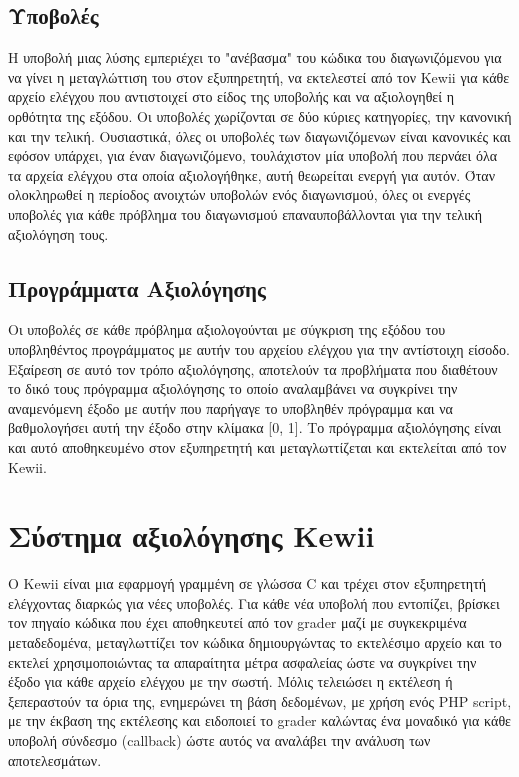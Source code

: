 \documentclass[diploma]{softlab-thesis}
\begin{document}
\subsection{Υποβολές}

Η υποβολή μιας λύσης εμπεριέχει το "ανέβασμα" του κώδικα του διαγωνιζόμενου για
να γίνει η μεταγλώττιση του στον εξυπηρετητή, να εκτελεστεί από τον Kewii για
κάθε αρχείο ελέγχου που αντιστοιχεί στο είδος της υποβολής και να αξιολογηθεί η
ορθότητα της εξόδου. Οι υποβολές χωρίζονται σε δύο κύριες κατηγορίες, την
κανονική και την τελική. Ουσιαστικά, όλες οι υποβολές των διαγωνιζόμενων είναι
κανονικές και εφόσον υπάρχει, για έναν διαγωνιζόμενο, τουλάχιστον μία υποβολή
που περνάει όλα τα αρχεία ελέγχου στα οποία αξιολογήθηκε, αυτή θεωρείται ενεργή
για αυτόν. Όταν ολοκληρωθεί η περίοδος ανοιχτών υποβολών ενός διαγωνισμού, όλες
οι ενεργές υποβολές για κάθε πρόβλημα του διαγωνισμού επαναυποβάλλονται για την
τελική αξιολόγηση τους.

\subsection{Προγράμματα Αξιολόγησης}

Οι υποβολές σε κάθε πρόβλημα αξιολογούνται με σύγκριση της εξόδου του υποβληθέντος
προγράμματος με αυτήν του αρχείου ελέγχου για την αντίστοιχη είσοδο. Εξαίρεση σε
αυτό τον τρόπο αξιολόγησης, αποτελούν τα προβλήματα που διαθέτουν το δικό τους
πρόγραμμα αξιολόγησης το οποίο αναλαμβάνει να συγκρίνει την αναμενόμενη έξοδο
με αυτήν που παρήγαγε το υποβληθέν πρόγραμμα και να βαθμολογήσει αυτή την έξοδο
στην κλίμακα [0, 1]. Το πρόγραμμα αξιολόγησης είναι και αυτό αποθηκευμένο στον
εξυπηρετητή και μεταγλωττίζεται και εκτελείται από τον Kewii.


\section{Σύστημα αξιολόγησης Kewii}

Ο Kewii είναι μια εφαρμογή γραμμένη σε γλώσσα C και τρέχει στον εξυπηρετητή
ελέγχοντας διαρκώς για νέες υποβολές. Για κάθε νέα υποβολή που εντοπίζει,
βρίσκει τον πηγαίο κώδικα που έχει αποθηκευτεί από τον grader μαζί με συγκεκριμένα
μεταδεδομένα, μεταγλωττίζει τον κώδικα δημιουργώντας το εκτελέσιμο αρχείο και το
εκτελεί χρησιμοποιώντας τα απαραίτητα μέτρα ασφαλείας ώστε να συγκρίνει την έξοδο
για κάθε αρχείο ελέγχου με την σωστή. Μόλις τελειώσει η εκτέλεση ή ξεπεραστούν τα
όρια της, ενημερώνει τη βάση δεδομένων, με χρήση ενός PHP script, με την έκβαση της
εκτέλεσης και ειδοποιεί το grader καλώντας ένα μοναδικό για κάθε υποβολή σύνδεσμο
(callback) ώστε αυτός να αναλάβει την ανάλυση των αποτελεσμάτων.
\end{document}
